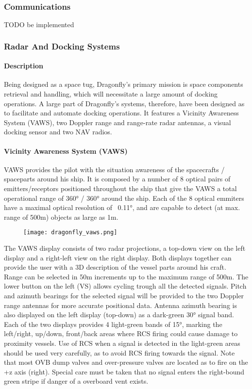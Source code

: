 \documentclass[Orbiter User Manual.tex]{subfiles}
\begin{document}
\subsubsection{Communications}
TODO be implemented

\subsubsection{Radar And Docking Systems}
\paragraph{Description}
Being designed as a space tug, Dragonfly's primary mission is space components retrieval and handling, which will necessitate a large amount of docking operations. A large part of Dragonfly's systems, therefore, have been designed as to facilitate and automate docking operations. It features a Vicinity Awareness System (VAWS), two Doppler range and range-rate radar antennas, a visual docking sensor and two NAV radios.


\paragraph{Vicinity Awareness System (VAWS)}
VAWS provides the pilot with the situation awareness of the spacecrafts / spaceparts around his ship. It is composed by a number of 8 optical pairs of emitters/receptors positioned throughout the ship that give the VAWS a total operational range of 360° / 360° around the ship. Each of the 8 optical emmiters have a maximal optical resolution of ~0.11°, and are capable to detect (at max. range of 500m) objects as large as 1m.

\begin{figure}[H]
  \centering
  \texttt{[image: dragonfly\_vaws.png]}
\end{figure}

\noindent
The VAWS display consists of two radar projections, a top-down view on the left display and a right-left view on the right display. Both displays together can provide the user with a 3D description of the vessel parts around his craft.\\
Range can be selected in 50m increments up to the maximum range of 500m. The lower button on the left (VS) allows cycling trough all the detected signals. Pitch and azimuth bearings for the selected signal will be provided to the two Doppler range antennas for more accurate positional data. Antenna azimuth bearing is also displayed on the left display (top-down) as a dark-green 30° signal band.\\
Each of the two displays provides 4 light-green bands of 15°, marking the left/right, up/down, front/back areas where RCS firing could cause damage to proximity vessels. Use of RCS when a signal is detected in the light-green areas should be used very carefully, as to avoid RCS firing towards the signal. Note that most OVB dump valves and over-pressure valves are located as to fire on the +z axis (right). Special care must be taken that no signal enters the right-bound green stripe if danger of a overboard vent exists.
\end{document}
